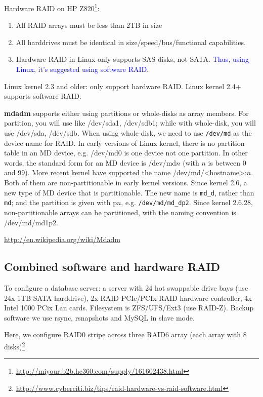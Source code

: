 Hardware RAID on HP
Z820\footnote{\url{http://miyour.b2b.hc360.com/supply/161602438.html}}:
\begin{enumerate}
  \item All RAID arrays must be less than 2TB in size
  \item All harddrives must be identical in size/speed/bus/functional
  capabilities.
  \item Hardware RAID in Linux only supports SAS disks, not SATA.
  \textcolor{blue}{Thus, using Linux, it's suggested using software RAID}.
\end{enumerate}

Linux kernel 2.3 and older: only support hardware RAID. Linux kernel 2.4+
supports software RAID.


{\bf mdadm} supports either using partitions or whole-disks as array members.
For partition, you will use like /dev/sda1, /dev/sdb1; while with whole-disk,
you will use /dev/sda, /dev/sdb. When using whole-disk, we need to use
\verb!/dev/md! as the device name for RAID. In early versions of Linux kernel,
there is no partition table in an MD device, e.g. /dev/md0 is one device not one
partition. In other words, the standard form for an MD device is /dev/md$n$
(with $n$ is between 0 and 99). More recent kernel have supported the name
/dev/md/<hostname>:$n$. Both of them are non-partitionable in early kernel
versions. Since kernel 2.6, a new type of MD device that is partitionable. The
new name is \verb!md_d!, rather than \verb!md!; and the partition is given with
p$n$, e.g.
\verb!/dev/md/md_dp2!. Since kernel 2.6.28, non-partitionable arrays can be
partitioned, with the naming convention is /dev/md/md1p2.

\url{http://en.wikipedia.org/wiki/Mdadm}

\subsection{Combined software and hardware RAID}

To configure a database server: a server with 24 hot swappable drive bays (use
24x 1TB SATA harddrive), 2x RAID PCIe/PCIx RAID hardware controller, 4x Intel
1000 PCix Lan cards. Filesystem is ZFS/UFS/Ext3 (use RAID-Z). Backup software we
use rsync, rsnapshots and MySQL in slave mode.

Here, we configure RAID0 stripe across three RAID6 array (each array with 8
disks)\footnote{\url{http://www.cyberciti.biz/tips/raid-hardware-vs-raid-software.html}}. 




